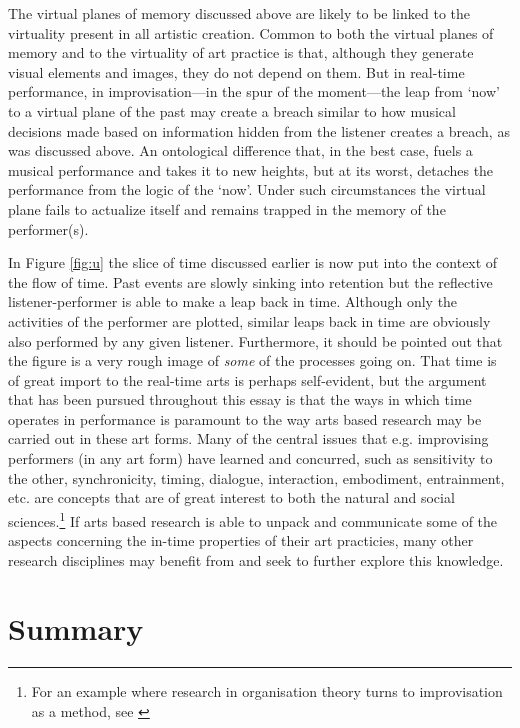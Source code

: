 The virtual planes of memory discussed above are likely to be linked to the virtuality present in all artistic creation. Common to both the virtual planes of memory and to the virtuality of art practice is that, although they generate visual elements and images, they do not depend on them.
But in real-time performance, in improvisation---in the spur of the moment---the leap from `now' to a virtual plane of the past may create a breach similar to how musical decisions made based on information hidden from the listener creates a breach, as was discussed above. An ontological difference that, in the best case, fuels a musical performance and takes it to new heights, but at its worst, detaches the performance from the logic of the `now'. Under such circumstances the virtual plane fails to actualize itself and remains trapped in the memory of the performer(s). %

In Figure \ref{fig:u} the slice of time discussed earlier is now put into the context of the flow of time. Past events are slowly sinking into retention but the reflective listener-performer is able to make a leap back in time. Although only the activities of the performer are plotted, similar leaps back in time are obviously also performed by any given listener. Furthermore, it should be pointed out that the figure is a very rough image of \emph{some} of the processes going on. That time is of great import to the real-time arts is perhaps self-evident, but the argument that has been pursued throughout this essay is that the ways in which time operates in performance is paramount to the way arts based research may be carried out in these art forms. Many of the central issues that e.g. improvising performers (in any art form) have learned and concurred, such as sensitivity to the other, synchronicity, timing, dialogue, interaction, embodiment, entrainment, etc. are concepts that are of great interest to both the natural and social sciences.\footnote{For an example where research in organisation theory turns to improvisation as a method, see \parencite{lindahl03}} If arts based research is able to unpack and communicate some of the aspects concerning the in-time properties of their art practicies, many other research disciplines may benefit from and seek to further explore this knowledge.

\section{Summary}
\label{sec:summary}

